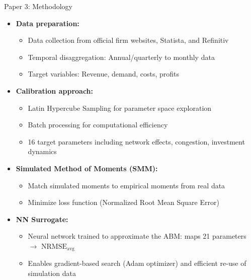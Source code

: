 \documentclass[10pt,aspectratio=169]{beamer}
\begin{document}
\begin{frame}{Paper 3: Methodology}
\begin{itemize}
    \item \textbf{Data preparation:}
    \begin{itemize}
        \item[-] Data collection from official firm websites, Statista, and Refinitiv
        \item[-] Temporal disaggregation: Annual/quarterly to monthly data
        \item[-] Target variables: Revenue, demand, costs, profits
    \end{itemize}
    
    \vspace{2mm}
    \item \textbf{Calibration approach:}
    \begin{itemize}
        \item[-] Latin Hypercube Sampling for parameter space exploration
        \item[-] Batch processing for computational efficiency
        \item[-] 16 target parameters including network effects, congestion, investment dynamics
    \end{itemize}
    \vspace{2mm}

    \item \textbf{Simulated Method of Moments (SMM):}
    \begin{itemize}
        \item[-] Match simulated moments to empirical moments from real data
        \item[-] Minimize loss function (Normalized Root Mean Square Error)
    \end{itemize}

    \vspace{2mm}
    \item \textbf{NN Surrogate:}
    \begin{itemize}
        \item[-] Neural network trained to approximate the ABM: maps 21 parameters $\rightarrow$ $\mathrm{NRMSE}_{\mathrm{avg}}$
        \item[-] Enables gradient-based search (Adam optimizer) and efficient re-use of simulation data
    \end{itemize}
\end{itemize}
\end{frame}
\end{document}
